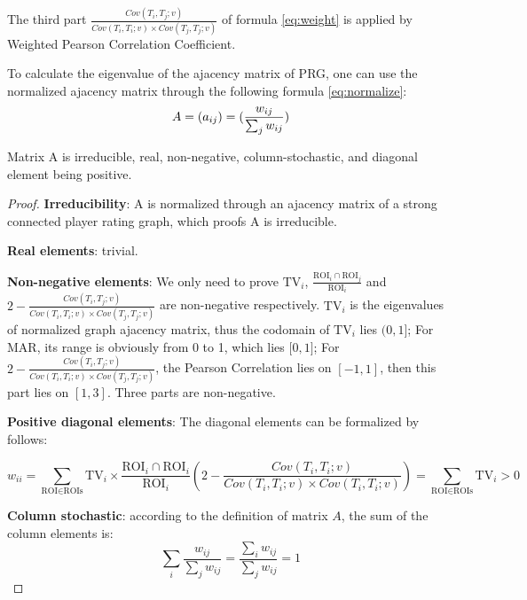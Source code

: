   The third part $\frac{Cov(T_i, T_j; v)}{Cov(T_i, T_i; v)\times Cov(T_j, T_j; v)}$
  of formula \ref{eq:weight} is applied by Weighted Pearson Correlation Coefficient. 
  
  To calculate the eigenvalue of the ajacency matrix of PRG, one can use the normalized ajacency matrix 
  through the following formula \ref{eq:normalize}:
  \begin{equation}
  \label{eq:normalize}
  A = (a_{ij}) = (\frac{w_{ij}}{\sum_{j}{w_{ij}}})\\
  \end{equation}

  \begin{theorem}
  Matrix A is irreducible, real, non-negative, column-stochastic, and diagonal element being positive.
  \end{theorem}

  \begin{proof}
  \textbf{Irreducibility}: A is normalized through an ajacency matrix of a strong connected player
  rating graph, which proofs A is irreducible.

  \textbf{Real elements}: trivial.
  
  \textbf{Non-negative elements}: We only need to prove $\text{TV}_i$, 
    $\frac{\text{ROI}_i\cap\text{ROI}_j}{\text{ROI}_i}$ and 
    $2-\frac{Cov(T_i, T_j; v)}{Cov(T_i, T_i; v)\times Cov(T_j, T_j; v)}$ are non-negative 
    respectively. $\text{TV}_i$ is the eigenvalues of normalized graph ajacency matrix, 
    thus the codomain of $\text{TV}_i$ lies $(0, 1\rbrack$; For MAR, its range is obviously from 0 to 1,
    which lies $\lbrack 0, 1 \rbrack$; For $2-\frac{Cov(T_i, T_j; v)}{Cov(T_i, T_i; v)\times Cov(T_j, T_j; v)}$,
    the Pearson Correlation lies on $[-1, 1]$, then this part lies on $[1, 3]$.
    Three parts are non-negative.
  
  \textbf{Positive diagonal elements}: The diagonal elements can be formalized by follows:

  \[
  w_{ii} = 
  \sum_{\text{ROI}\in\text{ROIs}}{
    \text{TV}_i \times
    \frac{\text{ROI}_i\cap\text{ROI}_i}{\text{ROI}_i}
    \left( 2-\frac{Cov(T_i, T_i; v)}
        {Cov(T_i, T_i; v)\times Cov(T_i, T_i; v)} \right)
  } = \sum_{\text{ROI}\in\text{ROIs}}{\text{TV}_i} > 0
  \]
  
  \textbf{Column stochastic}: according to the definition of matrix $A$, the sum of the column
  elements is:
  \[
    \sum_{i}{\frac{w_{ij}}{\sum_{j}{w_{ij}}}} 
    = \frac{\sum_{i}{w_{ij}}}{\sum_{j}{w_{ij}}} = 1
  \]
  \end{proof}

